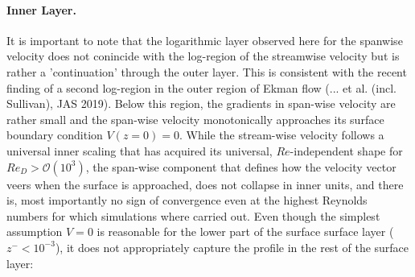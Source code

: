 \documentclass[a4paper,11pt]{article}
\begin{document}
\paragraph{Inner Layer.} It is important to note that the logarithmic layer observed here for the spanwise velocity does not
conincide with the log-region of the streamwise velocity but is rather a 'continuation' through the outer layer.
%
This is consistent with the recent finding of a second log-region in the outer region of Ekman flow
(... et al. (incl. Sullivan), JAS 2019).
%
Below this region, the gradients in span-wise velocity are rather small and the span-wise velocity
monotonically approaches its surface boundary condition $V(z=0)=0$.
%
While the stream-wise velocity follows a universal inner scaling that has acquired its universal, $Re$-independent shape for $Re_D> \mathcal{O}\left(10^3\right)$, the span-wise component that defines how the velocity vector veers when the surface is approached,
does not collapse in inner units, and there is, most importantly no sign of convergence even at the highest Reynolds numbers for
which simulations where carried out.
%
Even though the simplest assumption $V=0$ is reasonable for the lower part of the surface surface layer ($z^-<10^{-3}$), it does
not appropriately capture the profile in the rest of the surface layer:
\end{document}
